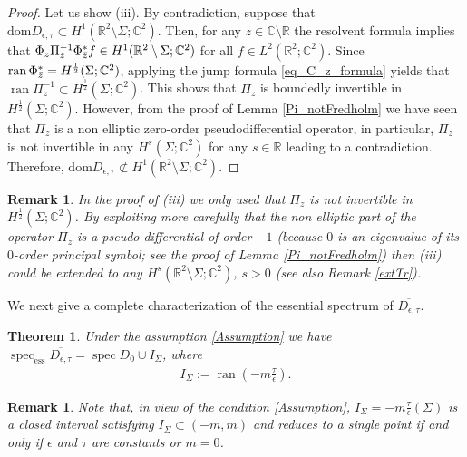 \documentclass[11pt,a4paper,reqno,oneside]{amsproc}
\DeclareMathOperator{\dom}{dom}
\DeclareMathOperator{\ran}{ran}
\DeclareMathOperator{\spec}{spec}
\newcommand{\spece}{\spec_\mathrm{ess}}
\def \rr {{\mathbb R}}
\def \cc {{\mathbb C}}
\numberwithin{equation}{section}
\def\dom{\mathrm{dom}}
\def \cc {{\mathbb{C}}}
\newtheorem{theorem}[definition]{Theorem}
\newtheorem{remark}[definition]{Remark}
\begin{document}
\begin{proof}
 Let us show (iii). By contradiction, suppose that $\dom \overline{D_{\epsilon, \tau}} \subset H^1(\rr^2\setminus\Sigma;\cc^2)$. Then, for any  $z\in\cc\setminus\rr$ the resolvent formula implies that $\Phi_{z} \Pi_{z}^{-1} \Phi_{\Bar{z}}^*f \in H^1(\rr^2\setminus\Sigma;\cc^2)$ for all $f \in L^2(\rr^2;\cc^2)$. Since $\ran  \Phi_{\Bar z}^\ast= H^{\frac{1}{2}}(\Sigma;\cc^2)$, applying the jump formula \eqref{eq_C_z_formula} yields that $\ran  \Pi_{z}^{-1}\subset H^{\frac{1}{2}}(\Sigma;\cc^2)$. This shows that $\Pi_{z}$ is boundedly invertible in $H^{\frac{1}{2}}(\Sigma;\cc^2)$. However, from the proof of Lemma \ref{Pi_notFredholm} we have seen that $\Pi_{z}$  is a non elliptic zero-order pseudodifferential operator, in particular, $\Pi_{z}$ is not invertible in any $H^s(\Sigma;\cc^2)$ for any $s\in\rr$ leading to a contradiction. Therefore, $\dom \overline{D_{\epsilon, \tau}} \not\subset H^1(\rr^2\setminus\Sigma;\cc^2)$.
\end{proof}
\begin{remark} In the proof of (iii) we only used that $\Pi_{z}$ is not invertible in $H^{\frac12}(\Sigma;\cc^2)$. By exploiting more carefully that the non elliptic part of the operator $\Pi_{z}$ is a pseudo-differential of order $-1$ (because $0$ is an eigenvalue of its $0$-order principal symbol; see the proof of Lemma \ref{Pi_notFredholm})  then (iii) could be extended to any $H^s(\rr^2\setminus\Sigma;\cc^2)$, $s>0$ (see also Remark \ref{extTr}). 
\end{remark}



We next give a complete characterization of the essential spectrum of $\overline{D_{\epsilon,\tau}}$.
\begin{theorem}\label{Ess Spec}Under the assumption \eqref{Assumption} we have $\spece \overline{D_{\epsilon,\tau}}= \spec D_0 \cup I_\Sigma$, where
\begin{align}\label{Def I Sigma}
I_\Sigma:=  \ran\left(-m\frac{\tau}{\epsilon}\right).
\end{align}
\end{theorem}
\begin{remark} Note that, in view of the condition \eqref{Assumption},  $I_\Sigma=-m \frac{\tau}{\epsilon}(\Sigma)$ is a closed interval satisfying $I_\Sigma \subset (-m, m)$ and reduces to a single point if and only if $\epsilon$ and $\tau$ are constants or $m=0$.
\end{remark}
\end{document}
